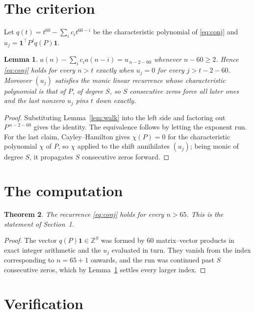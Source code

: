 \documentclass[11pt,a4paper]{article}
\theoremstyle{plain}
\newtheorem{theorem}{Theorem}
\newtheorem{lemma}[theorem]{Lemma}
\theoremstyle{definition}
\begin{document}
\section{The criterion}

Let $q(t)=t^{60}-\sum_i c_i t^{60-i}$ be the characteristic polynomial of
\eqref{eq:conj} and $u_j=\mathbf{1}^{\!\top}P^{j}q(P)\mathbf{1}$.

\begin{lemma}\label{lem:crit}
$a(n)-\sum_i c_i a(n-i)=u_{\,n-2-60}$ whenever $n-60\ge2$. Hence
\eqref{eq:conj} holds for every $n>t$ exactly when $u_j=0$ for every
$j>t-2-60$. Moreover $(u_j)$ satisfies the monic linear recurrence whose
characteristic polynomial is that of $P$, of degree $S$, so $S$ consecutive zeros force all
later ones and the last nonzero $u_j$ pins $t$ down exactly.
\end{lemma}

\begin{proof}
Substituting Lemma~\ref{lem:walk} into the left side and factoring out
$P^{\,n-2-60}$ gives the identity. The equivalence follows by letting the exponent
run. For the last claim, Cayley--Hamilton gives $\chi(P)=0$ for the characteristic
polynomial $\chi$ of $P$, so $\chi$ applied to the shift annihilates $(u_j)$; being monic of
degree $S$, it propagates $S$ consecutive zeros forward.
\end{proof}

\section{The computation}

\begin{theorem}
The recurrence \eqref{eq:conj} holds for every $n>65$. This is the statement of
Section~1.
\end{theorem}

\begin{proof}
The vector $q(P)\mathbf{1}\in\mathbb{Z}^{S}$ was formed by $60$ matrix--vector
products in exact integer arithmetic and the $u_j$ evaluated in turn. They vanish from the
index corresponding to $n=65+1$ onwards, and the run was continued past $S$ consecutive
zeros, which by Lemma~\ref{lem:crit} settles every larger index.
\end{proof}

\section{Verification}
\end{document}
